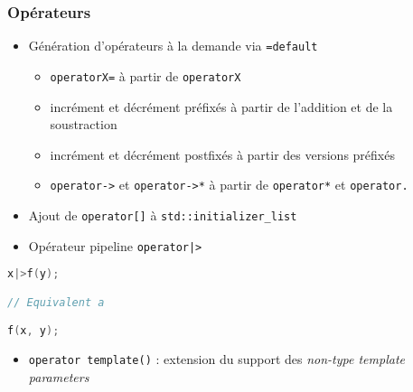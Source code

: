 \documentclass[C++.tex]{subfiles}
\begin{document}
\begin{frame}[fragile]
	\frametitle{Opérateurs}
	\begin{itemize}
		\item Génération d'opérateurs à la demande via \lstinline|=default|
		\begin{itemize}
			\item \lstinline|operatorX=| à partir de \lstinline|operatorX|
			\item incrément et décrément préfixés à partir de l'addition et de la soustraction
			\item incrément et décrément postfixés à partir des versions préfixés
			\item \lstinline|operator->| et \lstinline|operator->*| à partir de \lstinline|operator*| et \lstinline|operator.|


		\end{itemize}
		\item Ajout de \lstinline|operator[]| à \lstinline|std::initializer_list|
		\item Opérateur pipeline \lstinline!operator|>!
	\end{itemize}

	\begin{lstlisting}[language=C++]
x|>f(y);

// Equivalent a

f(x, y);\end{lstlisting}

	\begin{itemize}
		\item \lstinline|operator template()| : extension du support des \textit{non-type template parameters}
	\end{itemize}
\end{frame}
\end{document}
